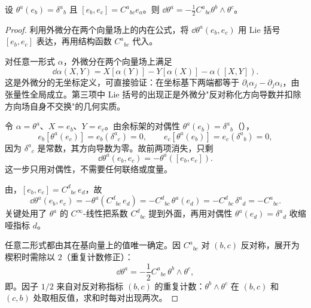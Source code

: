 \begin{proposition}[非完整余标架的结构方程]
设 $\theta^a(e_b)=\delta^a{}_b$ 且 $[e_b,e_c]=C^a{}_{bc}e_a$。则 $\dd\theta^a=-\frac12 C^a{}_{bc}\theta^b\wedge\theta^c$。
\end{proposition}
\begin{proof}
利用外微分在两个向量场上的内在公式，将 $\dd\theta^a(e_b,e_c)$ 用 Lie 括号 $[e_b,e_c]$ 表达，再用结构函数 $C^a{}_{bc}$ 代入。

对任意一形式 $\alpha$，外微分在两个向量场上满足
\begin{equation*}
 \dd\alpha(X,Y)
 =X[\alpha(Y)]-Y[\alpha(X)]-\alpha([X,Y]).
\end{equation*}
这是外微分的无坐标定义，可直接验证：在坐标基下两端都等于 $\partial_i\alpha_j-\partial_j\alpha_i$，由张量性全局成立。第三项中 Lie 括号的出现正是外微分"反对称化方向导数并扣除方向场自身不交换"的几何实质。

令 $\alpha=\theta^a$、$X=e_b$、$Y=e_c$。由余标架的对偶性 $\theta^a(e_b)=\delta^a{}_b$（），
\begin{equation*}
 e_b[\theta^a(e_c)]
 =e_b(\delta^a{}_c)=0,
 \qquad
 e_c[\theta^a(e_b)]
 =e_c(\delta^a{}_b)=0,
\end{equation*}
因为 $\delta^a{}_c$ 是常数，其方向导数为零。故前两项消失，只剩
\begin{equation*}
 \dd\theta^a(e_b,e_c)
 =-\theta^a([e_b,e_c]).
\end{equation*}
这一步只用对偶性，不需要任何联络或度量。

由，$[e_b,e_c]=C^d{}_{bc}\,e_d$，故
\begin{equation*}
 \dd\theta^a(e_b,e_c)
 =-\theta^a(C^d{}_{bc}\,e_d)
 =-C^d{}_{bc}\,\theta^a(e_d)
 =-C^d{}_{bc}\,\delta^a{}_d
 =-C^a{}_{bc}.
\end{equation*}
关键处用了 $\theta^a$ 的 $C^\infty$-线性把系数 $C^d{}_{bc}$ 提到外面，再用对偶性 $\theta^a(e_d)=\delta^a{}_d$ 收缩哑指标 $d$。

任意二形式都由其在基向量上的值唯一确定。因 $C^a{}_{bc}$ 对 $(b,c)$ 反对称，展开为楔积时需除以 $2$（重复计数修正）：
\begin{equation}
 \dd\theta^a
 =-\frac{1}{2}C^a{}_{bc}\,\theta^b\wedge\theta^c,
\end{equation}
即。因子 $1/2$ 来自对反对称指标 $(b,c)$ 的重复计数：$\theta^b\wedge\theta^c$ 在 $(b,c)$ 和 $(c,b)$ 处取相反值，求和时每对出现两次。


\end{proof}
